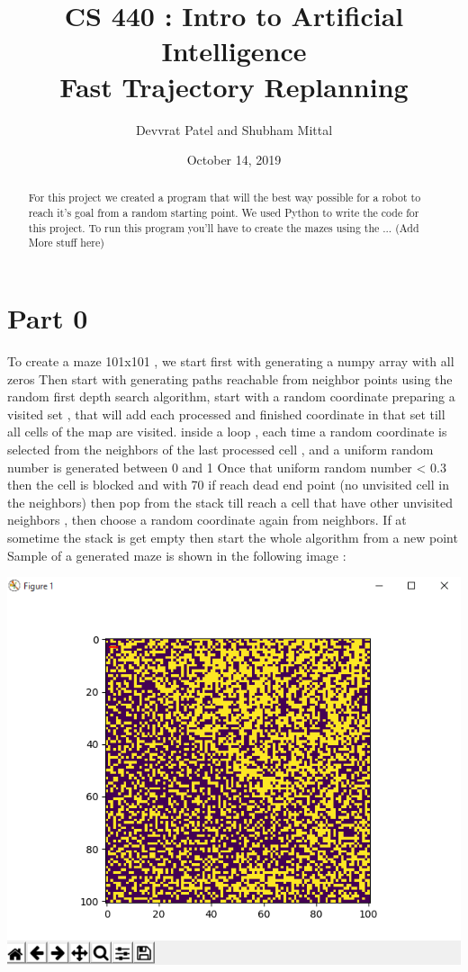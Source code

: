 \documentclass[a4paper, 12pt, one column]{article}
\title{CS 440 : Intro to Artificial Intelligence \\
\large Fast Trajectory Replanning}
\author{Devvrat Patel and Shubham Mittal}
\date{October 14, 2019}
\begin{document}
\maketitle

\newpage

\begin{abstract}
For this project we created a program that will the best way possible for a robot to reach it's goal from a random starting point. We used Python to write the code for this project. To run this program you'll have to create the mazes using the ... (Add More stuff here) 
\end{abstract}


\section*{Part 0}

	To create a maze 101x101 , we start first with generating a numpy array with all zeros 
	Then start with generating paths reachable from neighbor points using 
	the random first depth search algorithm, start with a random coordinate 
	preparing a visited set , that will add each processed and finished 
	coordinate in that set till all cells of the map are visited.
	inside a loop , each time a random coordinate is selected from the neighbors of the last processed cell , and a uniform random number is generated between 0 and 1
	Once that uniform random number < 0.3 then the cell is blocked 
	and with 70%
	if reach dead end point (no unvisited cell in the neighbors) then pop from the stack till reach a cell that have other unvisited neighbors , then choose a random coordinate again from neighbors.
	If at sometime the stack is get empty then start the whole algorithm from a new point 
	Sample of a generated maze is shown in the following image :
	
	\includegraphics{SampleMaze.png}
\end{document}
